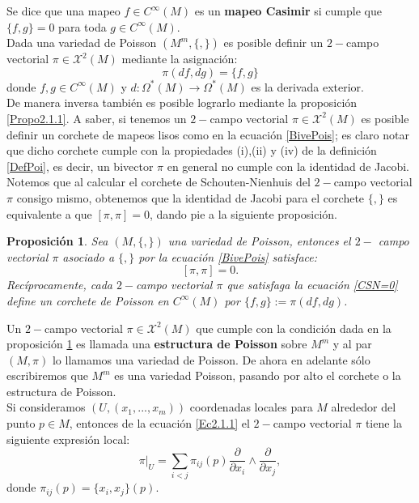 \documentclass[a4paper,10pt]{book}
\newtheorem{propo}{Proposici\'on}[chapter]
\begin{document}
Se dice que una mapeo $f\in C^{\infty}(M)$ es un {\bfseries mapeo Casimir} si cumple que $\{f,g\}=0$ para toda $g\in C^{\infty}(M)$.\\

Dada una variedad de Poisson $(M^{m},\{,\})$ es posible definir un $2-$campo vectorial $\pi\in\mathcal{X}^{2}(M)$ mediante la asignaci\'on: 
\begin{equation}\label{BivePois}
\pi(df,dg)=\{f,g\}
\end{equation}
donde $f,g\in C^{\infty}(M)$ y $d:\Omega^{*}(M)\to\Omega^{*}(M)$ es la derivada exterior.\\
 
De manera inversa tambi\'en es posible lograrlo mediante la proposici\'on \ref{Propo2.1.1}. A saber, si tenemos un $2-$campo vectorial $\pi\in\mathcal{X}^{2}(M)$ es posible definir un corchete de mapeos lisos como en la ecuaci\'on \ref{BivePois}; es claro notar que dicho corchete cumple con la propiedades (i),(ii) y (iv) de la definici\'on \ref{DefPoi}, es decir, un bivector $\pi$ en general no cumple con la identidad de Jacobi.\\

Notemos que al calcular el corchete de Schouten-Nienhuis del $2-$campo vectorial $\pi$ consigo mismo, obtenemos que la identidad de Jacobi para el corchete $\{,\}$ es equivalente a que $[\pi,\pi]=0$, dando pie a la siguiente proposici\'on. 
\begin{propo}\label{PropoBivPoi}
Sea $(M, \{,\})$ una variedad de Poisson, entonces el $2-$ campo vectorial $\pi$ asociado a $\{,\}$ por la ecuaci\'on \ref{BivePois} satisface:
\begin{equation}\label{CSN=0}
[\pi, \pi]=0.
\end{equation}
Rec\'iprocamente, cada $2-$campo vectorial $\pi$ que satisfaga la ecuaci\'on \ref{CSN=0} define un corchete de Poisson en $C^{\infty}(M)$ por $\{f,g\}:=\pi(df,dg)$.   
\end{propo}
Un $2-$campo vectorial $\pi\in\mathcal{X}^{2}(M)$ que cumple con la condici\'on dada en la proposici\'on \ref{PropoBivPoi} es llamada una {\bfseries estructura de Poisson} sobre $M^{m}$ y al par $(M, \pi)$ lo llamamos una variedad de Poisson. De ahora en adelante s\'olo escribiremos que $M^{m}$ es una variedad Poisson, pasando por alto el corchete o la estructura de Poisson.\\

Si consideramos $(U,(x_{1},...,x_{m}))$ coordenadas locales para $M$ alrededor del punto $p\in M$, entonces de la ecuaci\'on \ref{Ec2.1.1} el $2-$campo vectorial $\pi$ tiene la siguiente expresi\'on local:
\begin{equation}\label{Ec2.2.1}
\pi|_{U} = \sum_{i<j}\pi_{ij}(p)\frac{\partial}{\partial x_{i}}\wedge\frac{\partial}{\partial x_{j}},
\end{equation}
donde $\pi_{ij}(p)=\{x_{i},x_{j}\}(p)$.\\
\end{document}
